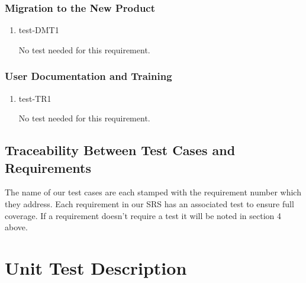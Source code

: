 \documentclass[12pt, titlepage]{article}
\begin{document}

\subsubsection{Migration to the New Product}

\begin{enumerate}

  \item{test-DMT1\\}
  
  No test needed for this requirement.

\end{enumerate}

\subsubsection{User Documentation and Training}

\begin{enumerate}

  \item{test-TR1\\}

  No test needed for this requirement.

\end{enumerate}

\subsection{Traceability Between Test Cases and Requirements}

The name of our test cases are each stamped with the requirement number which
they address. Each requirement in our SRS \cite{SRS} has an associated test to
ensure full coverage. If a requirement doesn't require a test it will be
noted in section 4 above.

\section{Unit Test Description}



\end{document}
